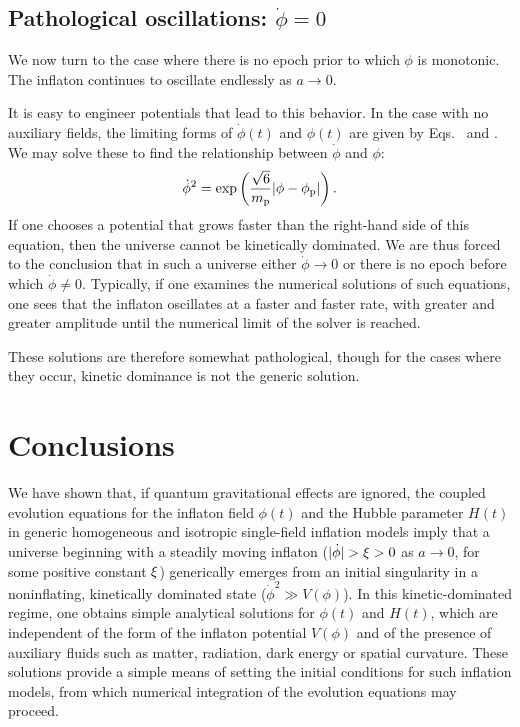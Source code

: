 \subsection{Pathological oscillations: $\dot{\phi}=0$}
We now turn to the case where there is no epoch prior to which $\phi$
is monotonic. The inflaton continues to oscillate endlessly as
$a\to0$. 

It is easy to engineer potentials that lead to this behavior. In the
case with no auxiliary fields, the limiting forms of $\dot{\phi}(t)$
and $\phi(t)$ are given by Eqs.\  and
. We may solve these to find the relationship
between $\dot{\phi}$ and $\phi$:
%
\begin{equation}
  \dot{\phi}^2 = \exp\left(\frac{\sqrt{6}}{m_{\mathrm{p}}} |\phi-\phi_{\mathrm{p}}|\right).
\end{equation}
%
If one chooses a potential that grows faster than the right-hand side
of this equation, then the universe cannot be kinetically dominated.
We are thus forced to the conclusion that in such a universe either
$\dot{\phi}\to 0$ or there is no epoch before which $\dot{\phi}\ne 0$.
Typically, if one examines the numerical solutions of such equations,
one sees that the inflaton oscillates at a faster and faster rate,
with greater and greater amplitude until the numerical limit of the
solver is reached.

These solutions are therefore somewhat pathological, though for the
cases where they occur, kinetic dominance is not the generic solution.









\section{Conclusions}
\label{sec:Conclusions}

We have shown that, if quantum gravitational effects are ignored, the
coupled evolution equations for the inflaton field $\phi(t)$ and the
Hubble parameter $H(t)$ in generic homogeneous and isotropic
single-field inflation models imply that a universe beginning with a
steadily moving inflaton ($|\dot{\phi}| > \xi > 0$ as $a\to 0$,
for some positive constant $\xi$) generically emerges from an
initial singularity in a noninflating, kinetically dominated state
($\dot{\phi}^2 \gg V(\phi)$).  In this kinetic-dominated regime, one
obtains simple analytical solutions for $\phi(t)$ and $H(t)$, which
are independent of the form of the inflaton potential $V(\phi)$ and of
the presence of auxiliary fluids such as matter, radiation, dark
energy or spatial curvature. These solutions provide a simple means of
setting the initial conditions for such inflation models, from which
numerical integration of the evolution equations may proceed.

